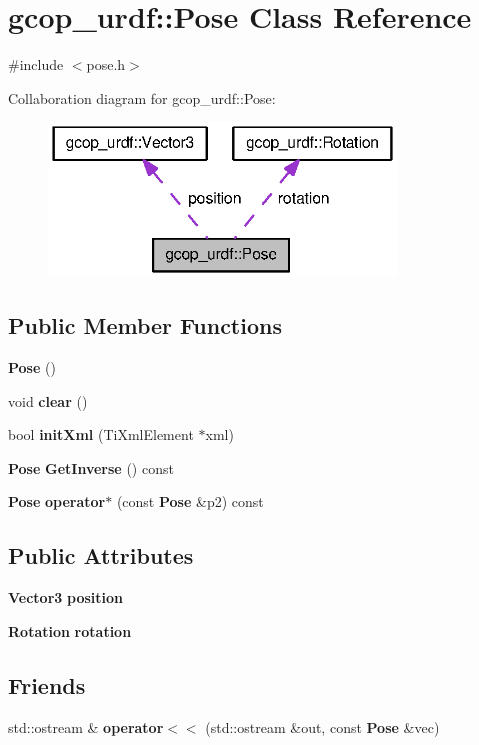 \section{gcop\-\_\-urdf\-:\-:\-Pose \-Class \-Reference}
\label{classgcop__urdf_1_1Pose}


{\ttfamily \#include $<$pose.\-h$>$}



\-Collaboration diagram for gcop\-\_\-urdf\-:\-:\-Pose\-:
\nopagebreak
\begin{figure}[H]
\begin{center}
\leavevmode
\includegraphics[width=262pt]{classgcop__urdf_1_1Pose__coll__graph}
\end{center}
\end{figure}
\subsection*{\-Public \-Member \-Functions}
\begin{DoxyCompactItemize}
\item 
{\bf \-Pose} ()
\item 
void {\bf clear} ()
\item 
bool {\bf init\-Xml} (\-Ti\-Xml\-Element $\ast$xml)
\item 
{\bf \-Pose} {\bf \-Get\-Inverse} () const 
\item 
{\bf \-Pose} {\bf operator$\ast$} (const {\bf \-Pose} \&p2) const 
\end{DoxyCompactItemize}
\subsection*{\-Public \-Attributes}
\begin{DoxyCompactItemize}
\item 
{\bf \-Vector3} {\bf position}
\item 
{\bf \-Rotation} {\bf rotation}
\end{DoxyCompactItemize}
\subsection*{\-Friends}
\begin{DoxyCompactItemize}
\item 
std\-::ostream \& {\bf operator$<$$<$} (std\-::ostream \&out, const {\bf \-Pose} \&vec)
\end{DoxyCompactItemize}


